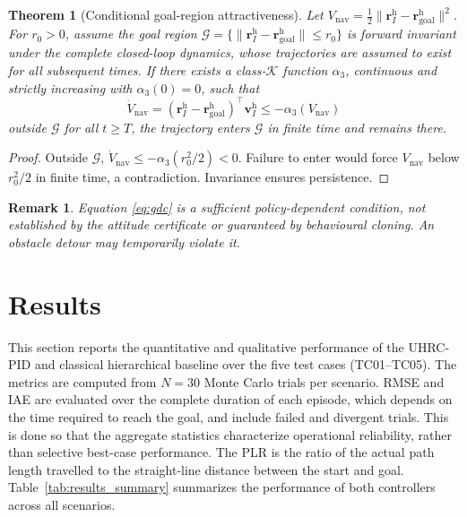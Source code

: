 \documentclass[12pt, a4paper]{article}
\newtheorem{theorem}{Theorem}
\newtheorem{remark}{Remark}
\begin{document}
\begin{theorem}[Conditional goal-region attractiveness]
\label{thm:conv}
Let $V_{\mathrm{nav}}=\tfrac12\|\mathbf r_I^{\mathrm h}
-\mathbf r_{\mathrm{goal}}^{\mathrm h}\|^2$.
For $r_0>0$, assume the goal region
$\mathcal G=\{\|\mathbf r_I^{\mathrm h}
-\mathbf r_{\mathrm{goal}}^{\mathrm h}\|\le r_0\}$ is forward invariant under the complete closed-loop dynamics, whose
trajectories are assumed to exist for all subsequent times.
If there exists a class-$\mathcal K$ function $\alpha_3$, continuous and
strictly increasing with $\alpha_3(0)=0$, such that
\begin{equation}
 \dot V_{\mathrm{nav}}
 =(\mathbf r_I^{\mathrm h}-\mathbf r_{\mathrm{goal}}^{\mathrm h})^\top
   \mathbf v_I^{\mathrm h}
 \le-\alpha_3(V_{\mathrm{nav}})
 \label{eq:gdc}
\end{equation}
outside $\mathcal G$ for all $t\ge T$, the trajectory enters
$\mathcal G$ in finite time and remains there.
\end{theorem}
\begin{proof}
Outside $\mathcal G$,
$\dot V_{\mathrm{nav}}\le-\alpha_3(r_0^2/2)<0$.
Failure to enter would force $V_{\mathrm{nav}}$ below $r_0^2/2$
in finite time, a contradiction. Invariance ensures persistence.
\end{proof}
\begin{remark}
Equation \eqref{eq:gdc} is a sufficient policy-dependent condition,
not established by the attitude certificate or guaranteed by behavioural cloning. An obstacle detour may
temporarily violate it. 
\end{remark}

\section{Results}
\label{sec:results}

This section reports the quantitative and qualitative performance of the UHRC-PID and classical hierarchical baseline over the five test cases (TC01--TC05).
The metrics are computed from $N = 30$ Monte Carlo trials per scenario.
RMSE and IAE are evaluated over the complete duration of each episode, which depends on the time required to reach the goal, and include failed and divergent trials.
This is done so that the aggregate statistics characterize operational reliability, rather than selective best-case performance.
The PLR is the ratio of the actual path length travelled to the straight-line distance between the start and goal.
Table~\ref{tab:results_summary} summarizes the performance of both controllers across all scenarios.
\end{document}
